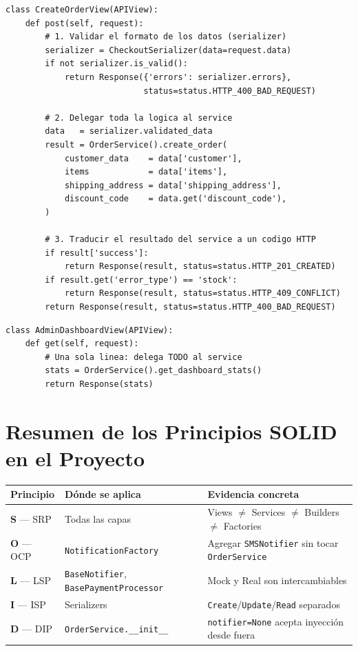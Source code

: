 \documentclass[12pt, a4paper]{article}
\begin{document}
\begin{lstlisting}[caption={orders/views.py -- CreateOrderView (checkout)}]
class CreateOrderView(APIView):
    def post(self, request):
        # 1. Validar el formato de los datos (serializer)
        serializer = CheckoutSerializer(data=request.data)
        if not serializer.is_valid():
            return Response({'errors': serializer.errors},
                            status=status.HTTP_400_BAD_REQUEST)

        # 2. Delegar toda la logica al service
        data   = serializer.validated_data
        result = OrderService().create_order(
            customer_data    = data['customer'],
            items            = data['items'],
            shipping_address = data['shipping_address'],
            discount_code    = data.get('discount_code'),
        )

        # 3. Traducir el resultado del service a un codigo HTTP
        if result['success']:
            return Response(result, status=status.HTTP_201_CREATED)
        if result.get('error_type') == 'stock':
            return Response(result, status=status.HTTP_409_CONFLICT)
        return Response(result, status=status.HTTP_400_BAD_REQUEST)
\end{lstlisting}

\begin{lstlisting}[caption={orders/views.py -- AdminDashboardView}]
class AdminDashboardView(APIView):
    def get(self, request):
        # Una sola linea: delega TODO al service
        stats = OrderService().get_dashboard_stats()
        return Response(stats)
\end{lstlisting}

\section{Resumen de los Principios SOLID en el Proyecto}

\begin{center}
\begin{tabular}{@{}lll@{}}
\toprule
\textbf{Principio} & \textbf{Dónde se aplica} & \textbf{Evidencia concreta} \\
\midrule
\textbf{S} — SRP
  & Todas las capas
  & Views $\neq$ Services $\neq$ Builders $\neq$ Factories \\
\textbf{O} — OCP
  & \texttt{NotificationFactory}
  & Agregar \texttt{SMSNotifier} sin tocar \texttt{OrderService} \\
\textbf{L} — LSP
  & \texttt{BaseNotifier}, \texttt{BasePaymentProcessor}
  & Mock y Real son intercambiables \\
\textbf{I} — ISP
  & Serializers
  & \texttt{Create}/\texttt{Update}/\texttt{Read} separados \\
\textbf{D} — DIP
  & \texttt{OrderService.\_\_init\_\_}
  & \texttt{notifier=None} acepta inyección desde fuera \\
\bottomrule
\end{tabular}
\end{center}
\end{document}
